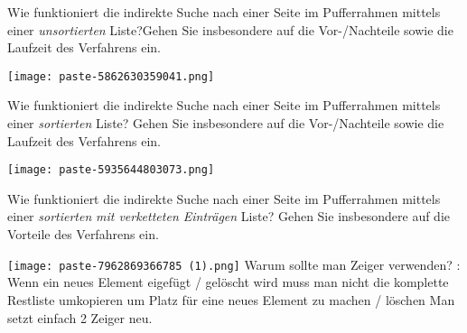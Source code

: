 \documentclass{article}
\begin{document}
\begin{tcolorbox}[colback=white!10!white,colframe=lightgray!75!black,
  savelowerto=\jobname_ex.tex,breakable,enhanced,lines before break=40]

\begin{center}
 Wie funktioniert die indirekte Suche nach einer Seite im Pufferrahmen mittels einer 
\textit{unsortierten
} Liste?Gehen Sie insbesondere auf die Vor-/Nachteile sowie die Laufzeit des Verfahrens ein. 

\end{center}

\tcblower

\justifying
\texttt{[image: paste-5862630359041.png]}

\end{tcolorbox}
\begin{tcolorbox}[colback=white!10!white,colframe=lightgray!75!black,
  savelowerto=\jobname_ex.tex,breakable,enhanced,lines before break=40]

\begin{center}
 Wie funktioniert die indirekte Suche nach einer Seite im Pufferrahmen mittels einer
\textit{sortierten
} Liste? Gehen Sie insbesondere auf die Vor-/Nachteile sowie die Laufzeit des Verfahrens ein. 

\end{center}

\tcblower

\justifying
\texttt{[image: paste-5935644803073.png]}

\end{tcolorbox}
\begin{tcolorbox}[colback=white!10!white,colframe=lightgray!75!black,
  savelowerto=\jobname_ex.tex,breakable,enhanced,lines before break=40]

\begin{center}
 Wie funktioniert die indirekte Suche nach einer Seite im Pufferrahmen mittels einer
\textit{sortierten
}\textit{mit verketteten Einträgen
}Liste? Gehen Sie insbesondere auf die Vorteile des Verfahrens ein. 

\end{center}

\tcblower

\justifying
\texttt{[image: paste-7962869366785 (1).png]}
Warum sollte man Zeiger verwenden?
:
Wenn ein neues Element eigefügt / gelöscht wird muss man nicht die komplette Restliste umkopieren um Platz für eine neues Element zu machen / löschen  Man setzt einfach 2 Zeiger neu.

\end{tcolorbox}
\end{document}
